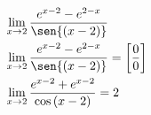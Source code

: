\begin{ex}
\begin{align}
&\lim_{x\rightarrow 2} \frac{e^{x-2}-e^{2-x}}{\sen{(x-2)}}\nonumber\\
&\lim_{x\rightarrow 2} \frac{e^{x-2}-e^{2-x}}{\sen{(x-2)}}=\left[\frac{0}{0}\right]\nonumber\\
&\lim_{x\rightarrow 2} \frac{e^{x-2}+e^{x-2}}{\cos{(x-2)}}=2\nonumber
\end{align}
\end{ex}